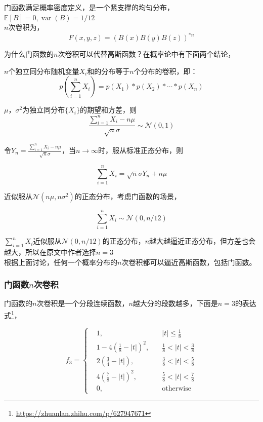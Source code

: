 			门函数满足概率密度定义，是一个紧支撑的均匀分布，$\mathbb{E}[B] = 0, \mathop{var}(B) = 1/12$\\

			$n$次卷积为，
			$$
				F(x,y,z) = \left(B(x)B(y)B(z)\right)^{*n}
			$$

			为什么门函数的$n$次卷积可以代替高斯函数？在概率论中有下面两个结论，

			 \quad $n$个独立同分布随机变量$X_i$和的分布等于$n$个分布的卷积，即：
				$$
					p\left(\sum_{i=1}^nX_i\right) = p(X_1) * p(X_2) * \cdots * p(X_n)
				$$

			\quad $\mu$，$\sigma^2$为独立同分布$\{X_i\}$的期望和方差，则
				$$
					\frac{\sum_{i=1}^nX_i - n\mu}{\sqrt{n}\sigma} \sim \mathcal{N}(0, 1)
				$$

				令$Y_n = \frac{\sum_{i=1}^nX_i - n\mu}{\sqrt{n}\sigma}$，当$n \rightarrow \infty$时，服从标准正态分布，则

				$$
					\sum_{i=1}^nX_i  = \sqrt{n}\sigma Y_n + n\mu
				$$

				近似服从$\mathcal{N}(n\mu, n\sigma^2)$的正态分布，考虑门函数的场景，

				$$
					\sum_{i=1}^nX_i \sim \mathcal{N}(0, n/12)
				$$

				$\sum_{i=1}^nX_i$近似服从$\mathcal{N}(0, n/12)$的正态分布，$n$越大越逼近正态分布，但方差也会越大，所以在原文中作者选择$n=3$\\
			

			根据上面讨论，任何一个概率分布的$n$次卷积都可以逼近高斯函数，包括门函数。

		\subsubsection*{门函数$n$次卷积}
			门函数的$n$次卷积是一个分段连续函数，$n$越大分的段数越多，下面是$n=3$的表达式\footnote{\url{https://zhuanlan.zhihu.com/p/627947671}}，

			$$
				f_3 = \left\lbrace 
					\begin{aligned}
						&1,  &\quad |t| \leq \frac{1}{8}\\
						&1 - 4\left(\frac{1}{8} - |t|\right)^2, & \quad\frac{1}{8} < |t| < \frac{3}{8}\\
						&2\left(\frac{3}{4} - |t|\right), & \quad \frac{3}{8} < |t| < \frac{5}{8}\\
						&4\left(\frac{7}{8} - |t|\right)^2, & \quad \frac{5}{8} < |t| < \frac{7}{8}\\
						&0, & \quad \text{otherwise}
					\end{aligned}
					\right .
			$$


